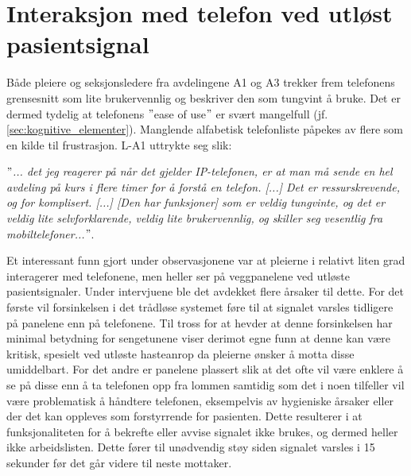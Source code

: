 \section{Interaksjon med telefon ved utløst pasientsignal}
Både pleiere og seksjonsledere fra avdelingene A1 og A3 trekker frem telefonens grensesnitt som lite brukervennlig og beskriver den som tungvint å bruke. Det er dermed tydelig at telefonens $"$ease of use$"$ er svært mangelfull (jf. \ref{sec:kognitive_elementer}). Manglende alfabetisk telefonliste påpekes av flere som en kilde til frustrasjon. L-A1 uttrykte seg slik:

\noindent
\textit{ $"$... det jeg reagerer på når det gjelder IP-telefonen, er at man må sende en hel avdeling på kurs i flere timer for å forstå en telefon. [...] Det er ressurskrevende, og for komplisert. [...] [Den har funksjoner] som er veldig tungvinte, og det er veldig lite selvforklarende, veldig lite brukervennlig, og skiller seg vesentlig fra mobiltelefoner...$"$}.

\noindent
Et interessant funn gjort under observasjonene var at pleierne i relativt liten grad interagerer med telefonene, men heller ser på veggpanelene ved utløste pasientsignaler. Under intervjuene ble det avdekket flere årsaker til dette. For det første vil forsinkelsen i det trådløse systemet føre til at signalet varsles tidligere på panelene enn på telefonene. Til tross for at \citet{Sletten09} hevder at denne forsinkelsen har minimal betydning for sengetunene viser derimot egne funn at denne kan være kritisk, spesielt ved utløste hasteanrop da pleierne ønsker å motta disse umiddelbart. For det andre er panelene plassert slik at det ofte vil være enklere å se på disse enn å ta telefonen opp fra lommen samtidig som det i noen tilfeller vil være problematisk å håndtere telefonen, eksempelvis av hygieniske årsaker eller der det kan oppleves som forstyrrende for pasienten. Dette resulterer i at funksjonaliteten for å bekrefte eller avvise signalet ikke brukes, og dermed heller ikke arbeidslisten. Dette fører til unødvendig støy siden signalet varsles i 15 sekunder før det går videre til neste mottaker. 

